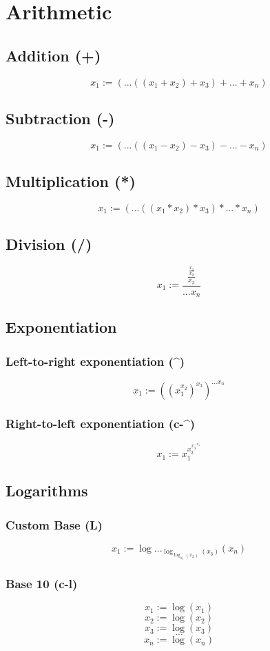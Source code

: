 \documentclass[12pt]{article}
\begin{document}
\section*{Arithmetic}
\label{sec:org2f55434}
\subsection*{Addition (+)}
\label{sec:org34308df}
$$
x_1 := (...((x_1 + x_2) + x_3) + ... + x_n)
$$
\subsection*{Subtraction (-)}
\label{sec:org29b6ef6}
$$
x_1 := (...((x_1 - x_2) - x_3) - ... - x_n)
$$
\subsection*{Multiplication (*)}
\label{sec:orga2a1305}
$$
x_1 := (...((x_1 * x_2) * x_3) * ... * x_n)
$$
\subsection*{Division (/)}
\label{sec:org6a3938b}
$$
x_1 := \frac{\frac{\frac{x_1}{x_2}}{x_3}}{...x_n}
$$
\subsection*{Exponentiation}
\label{sec:org8f4c9b9}
\subsubsection*{Left-to-right exponentiation (\^{})}
\label{sec:org67f07d7}
$$
x_1 := ((x_1^{x_2})^{x_3})^{...x_n}
$$
\subsubsection*{Right-to-left exponentiation (c-\^{})}
\label{sec:orgd1492af}
$$
x_1 := x_1^{x_2^{x_3^{...x_n}}}
$$
\subsection*{Logarithms}
\label{sec:org647856b}
\subsubsection*{Custom Base (L)}
\label{sec:org1f59ef8}
$$
x_1 := \log..._{\log_{\log_{x_1}(x_2)}(x_3)}(x_n)
$$
\subsubsection*{Base 10 (c-l)}
\label{sec:org67a93ca}
$$
x_1 := \log(x_1)
$$
$$
x_2 := \log(x_2)
$$
$$
x_3 := \log(x_3)
$$
$$
...
$$
$$
x_n := \log(x_n)
$$
\end{document}
